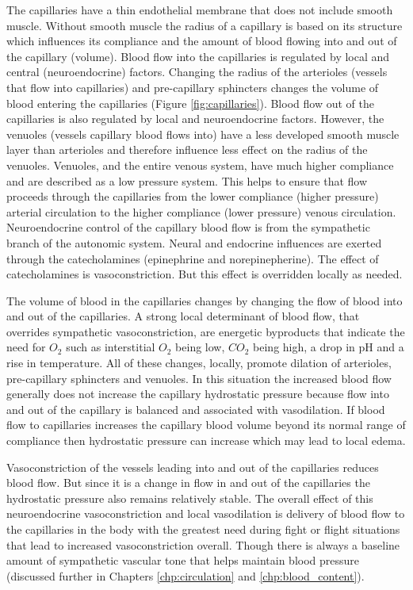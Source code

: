 The capillaries have a thin endothelial membrane that does not include smooth muscle. Without smooth muscle the radius of a capillary is based on its structure which influences its compliance and the amount of blood flowing into and out of the capillary (volume). Blood flow into the capillaries is regulated by local and central (neuroendocrine) factors. Changing the radius of the arterioles (vessels that flow into capillaries) and pre-capillary sphincters changes the volume of blood entering the capillaries (Figure \ref{fig:capillaries}). Blood flow out of the capillaries is also regulated by local and neuroendocrine factors. However, the venuoles (vessels capillary blood flows into) have a less developed smooth muscle layer than arterioles and therefore influence less effect on the radius of the venuoles. Venuoles, and the entire venous system, have much higher compliance and are described as a low pressure system. This helps to ensure that flow proceeds through the capillaries from the lower compliance (higher pressure) arterial circulation to the higher compliance (lower pressure) venous circulation. Neuroendocrine control of the capillary blood flow is from the sympathetic branch of the autonomic system. Neural and endocrine influences are exerted through the catecholamines (epinephrine and norepinepherine). The effect of catecholamines is vasoconstriction. But this effect is overridden locally as needed. 

The volume of blood in the capillaries changes by changing the flow of blood into and out of the capillaries. A strong local determinant of blood flow, that overrides sympathetic vasoconstriction, are energetic byproducts that indicate the need for $O_2$ such as interstitial $O_2$ being low, $CO_2$ being high, a drop in pH and a rise in temperature. All of these changes, locally, promote dilation of arterioles, pre-capillary sphincters and venuoles. In this situation the increased blood flow generally does not increase the capillary hydrostatic pressure because flow into and out of the capillary is balanced and associated with vasodilation. If blood flow to capillaries increases the capillary blood volume beyond its normal range of compliance then hydrostatic pressure can increase which may lead to local edema.

Vasoconstriction of the vessels leading into and out of the capillaries reduces blood flow. But since it is a change in flow in and out of the capillaries the hydrostatic pressure also remains relatively stable. The overall effect of this neuroendocrine vasoconstriction and local vasodilation is delivery of blood flow to the capillaries in the body with the greatest need during fight or flight situations that lead to increased vasoconstriction overall. Though there is always a baseline amount of sympathetic vascular tone that helps maintain blood pressure (discussed further in Chapters \ref{chp:circulation} and \ref{chp:blood_content}).

